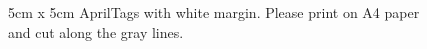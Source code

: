 \documentclass{article}
\providecommand{\sizecm}{5}
\begin{document}
\setlength{\fboxsep}{0pt}
\setlength{\fboxrule}{0.5pt}

\begin{figure}[htbp]
    \centering
    \caption{\sizecm cm x \sizecm cm AprilTags with white margin. Please print on A4 paper and cut along the gray lines.}
\end{figure}
\end{document}
